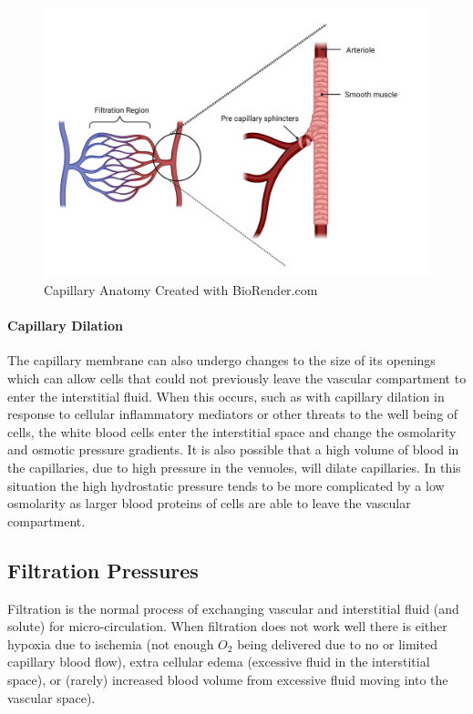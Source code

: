 \begin{figure}[!h]
    \centering
    \includegraphics[width=1\linewidth]{./figure/capillaries.png}
    \caption{Capillary Anatomy \footnotesize{Created with BioRender.com}}
    \label{fig:capillaries}
\end{figure}

\paragraph{Capillary Dilation}
The capillary membrane can also undergo changes to the size of its openings which can allow cells that could not previously leave the vascular compartment to enter the interstitial fluid. When this occurs, such as with capillary dilation in response to cellular inflammatory mediators or other threats to the well being of cells, the white blood cells enter the interstitial space and change the osmolarity and osmotic pressure gradients. It is also possible that a high volume of blood in the capillaries, due to high pressure in the venuoles, will dilate capillaries. In this situation the high hydrostatic pressure tends to be more complicated by a low osmolarity as larger blood proteins of cells are able to leave the vascular compartment.

\subsection{Filtration Pressures}

Filtration is the normal process of exchanging vascular and interstitial fluid (and solute) for micro-circulation. When filtration does not work well there is either hypoxia due to ischemia (not enough $O_2$ being delivered due to no or limited capillary blood flow), extra cellular edema (excessive fluid in the interstitial space), or (rarely) increased blood volume from excessive fluid moving into the vascular space).


